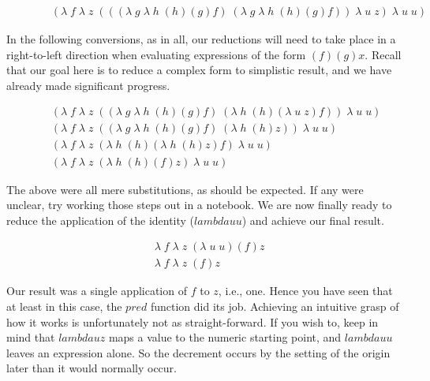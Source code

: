 \begin{figure}[ht]
\caption{}\label{scheme}
\begin{align*}
& (\lambda \; f \; \lambda \; z \; (((\lambda \; g \; \lambda \; h \; (h)(g)f) \; (\lambda \; g \; \lambda \; h \; (h)(g)f)) \; \lambda \; u \; z) \; \lambda \; u \; u)
\end{align*}
\end{figure}

In the following conversions, as in all, our reductions will need to take place in 
a right-to-left direction when evaluating expressions of the form $(f)(g)x$.
Recall that our goal here is to reduce a complex form to simplistic result, and we 
have already made significant progress.

\begin{figure}[ht]
\caption{}\label{scheme}
\begin{align*}
& (\lambda \; f \; \lambda \; z \; ((\lambda \; g \; \lambda \; h \; (h)(g)f) \; (\lambda \; h \; (h)(\lambda \; u \; z)f)) \; \lambda \; u \; u)
\\& (\lambda \; f \; \lambda \; z \; ((\lambda \; g \; \lambda \; h \; (h)(g)f) \; (\lambda \; h \; (h)z)) \; \lambda \; u \; u)
\\& (\lambda \; f \; \lambda \; z \; (\lambda \; h \; (h)(\lambda \; h \; (h)z)f) \; \lambda \; u \; u)
\\& (\lambda \; f \; \lambda \; z \; (\lambda \; h \; (h)(f)z) \; \lambda \; u \; u)
\end{align*}
\end{figure}
The above were all mere substitutions, as should be expected. If any were unclear, 
try working those steps out in a notebook. We are now finally ready to reduce the
application of the identity ($lambda u u$) and achieve our final result.

\begin{figure}[ht]
\caption{}\label{scheme}
\begin{align*}
& \lambda \; f \; \lambda \; z \; (\lambda \; u \; u)(f)z
\\& \lambda \; f \; \lambda \; z \; (f)z
\end{align*}
\end{figure}

Our result was a single application of $f$ to $z$, i.e., one. Hence you have seen 
that at least in this case, the $pred$ function did its job. Achieving an
intuitive grasp of how it works is unfortunately not as straight-forward. If you
wish to, keep in mind that $lambda u z$ maps a value to the numeric starting
point, and $lambda u u$ leaves an expression alone. So the decrement occurs by
the setting of the origin later than it would normally occur.

